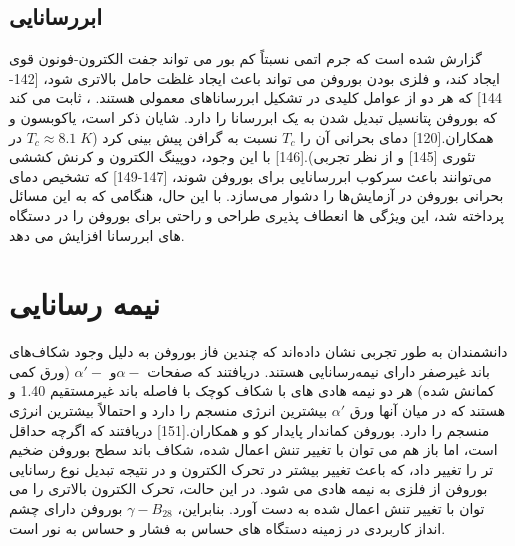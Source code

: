 \subsection{ابررسانایی}
گزارش شده است که جرم اتمی نسبتاً کم بور می تواند جفت الکترون-فونون قوی ایجاد کند، و فلزی بودن بوروفن می تواند باعث ایجاد غلظت حامل بالاتری شود، \cite{kortusSuperconductivityMetallicBoron2001, choiOriginAnomalousSuperconducting2002, anSuperconductivityMgB2Covalent2001}[142-144] که هر دو از عوامل کلیدی در تشکیل ابررساناهای معمولی هستند. ، ثابت می کند که بوروفن پتانسیل تبدیل شدن به یک ابررسانا را دارد. شایان ذکر است، یاکوبسون و همکاران.\cite{penevCanTwoDimensionalBoron2016}[120] دمای بحرانی آن را $T_c$ نسبت به گرافن پیش بینی کرد ($T_c ≈ 8.1\; K$ در تئوری \cite{profetaPhononmediatedSuperconductivityGraphene2012}[145] و  از نظر تجربی).\cite{xueSuperconductivityPotassiumDopedFewLayer2012}[146] با این وجود، دوپینگ الکترون و کرنش کششی می‌توانند باعث سرکوب ابررسانایی برای بوروفن شوند، \cite{chengSuppressedSuperconductivitySubstratesupported2017, xiaoEnhancedSuperconductivityStrain2016}\cite{wuLithiumBoronLiBMonolayers2016}[147-149] که تشخیص دمای بحرانی بوروفن در آزمایش‌ها را دشوار می‌سازد. با این حال، هنگامی که به این مسائل پرداخته شد، این ویژگی ها انعطاف پذیری طراحی و راحتی برای بوروفن را در دستگاه های ابررسانا افزایش می دهد.
\section{نیمه رسانایی}
دانشمندان به طور تجربی نشان داده‌اند که چندین فاز بوروفن به دلیل وجود شکاف‌های باند غیرصفر دارای نیمه‌رسانایی هستند. دریافتند که صفحات $\alpha-$و $\alpha\prime-$ (ورق کمی کمانش شده) هر دو نیمه هادی های با شکاف کوچک با فاصله باند غیرمستقیم 1.40 و  هستند که در میان آنها ورق $\alpha\prime$ بیشترین انرژی منسجم را دارد و احتمالاً بیشترین انرژی منسجم را دارد. بوروفن کماندار پایدار کو و همکاران.\cite{kouHighmobilityAnisotropicTransport2016}[151] دریافتند که اگرچه حداقل است، اما باز هم می توان با تغییر تنش اعمال شده، شکاف باند سطح بوروفن ضخیم تر را تغییر داد، که باعث تغییر بیشتر در تحرک الکترون و در نتیجه تبدیل نوع رسانایی بوروفن از فلزی به نیمه هادی می شود. در این حالت، تحرک الکترون بالاتری را می توان با تغییر تنش اعمال شده به دست آورد. بنابراین، $\gamma-B_28$ بوروفن دارای چشم انداز کاربردی در زمینه دستگاه های حساس به فشار و حساس به نور است.

